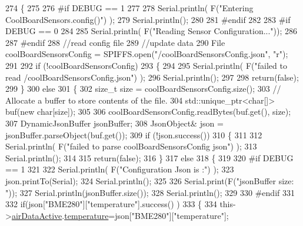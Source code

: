 \begin{DoxyCode}
274 \{
275 
276 \textcolor{preprocessor}{#if DEBUG == 1}
277 
278     Serial.println( F(\textcolor{stringliteral}{"Entering CoolBoardSensors.config()"}) );
279     Serial.println();
280 
281 \textcolor{preprocessor}{#endif}
282 
283 \textcolor{preprocessor}{#if DEBUG == 0}
284 
285     Serial.println( F(\textcolor{stringliteral}{"Reading Sensor Configuration..."}));
286 
287 \textcolor{preprocessor}{#endif}
288     \textcolor{comment}{//read config file}
289     \textcolor{comment}{//update data}
290     File coolBoardSensorsConfig = SPIFFS.open(\textcolor{stringliteral}{"/coolBoardSensorsConfig.json"}, \textcolor{stringliteral}{"r"});
291 
292     \textcolor{keywordflow}{if} (!coolBoardSensorsConfig) 
293     \{
294     
295         Serial.println( F(\textcolor{stringliteral}{"failed to read /coolBoardSensorsConfig.json"}) );
296         Serial.println();
297 
298         \textcolor{keywordflow}{return}(\textcolor{keyword}{false});
299     \}
300     \textcolor{keywordflow}{else}
301     \{
302         \textcolor{keywordtype}{size\_t} size = coolBoardSensorsConfig.size();
303         \textcolor{comment}{// Allocate a buffer to store contents of the file.}
304         std::unique\_ptr<char[]> buf(\textcolor{keyword}{new} \textcolor{keywordtype}{char}[size]);
305 
306         coolBoardSensorsConfig.readBytes(buf.get(), size);
307         DynamicJsonBuffer jsonBuffer;
308         JsonObject& json = jsonBuffer.parseObject(buf.get());
309         \textcolor{keywordflow}{if} (!json.success()) 
310         \{
311 
312             Serial.println( F(\textcolor{stringliteral}{"failed to parse coolBoardSensorsConfig json"}) );
313             Serial.println();
314     
315             \textcolor{keywordflow}{return}(\textcolor{keyword}{false});
316         \} 
317         \textcolor{keywordflow}{else}
318         \{
319 
320 \textcolor{preprocessor}{        #if DEBUG == 1}
321 
322             Serial.println( F(\textcolor{stringliteral}{"Configuration Json is :"}) );
323             json.printTo(Serial);
324             Serial.println();
325 
326             Serial.print(F(\textcolor{stringliteral}{"jsonBuffer size: "}));
327             Serial.println(jsonBuffer.size());
328             Serial.println();
329         
330 \textcolor{preprocessor}{        #endif}
331             
332             \textcolor{keywordflow}{if}(json[\textcolor{stringliteral}{"BME280"}][\textcolor{stringliteral}{"temperature"}].success() )
333             \{           
334                 this->\hyperlink{class_cool_board_sensors_abff8dfeccb2f7689847bb64d5f1cd31e}{airDataActive}.\hyperlink{struct_cool_board_sensors_1_1air_active_ac08576736c7ac3bfbfec32e5ee17c686}{temperature}=json[\textcolor{stringliteral}{"BME280"}][\textcolor{stringliteral}{"temperature"}];

\end{DoxyCode}
